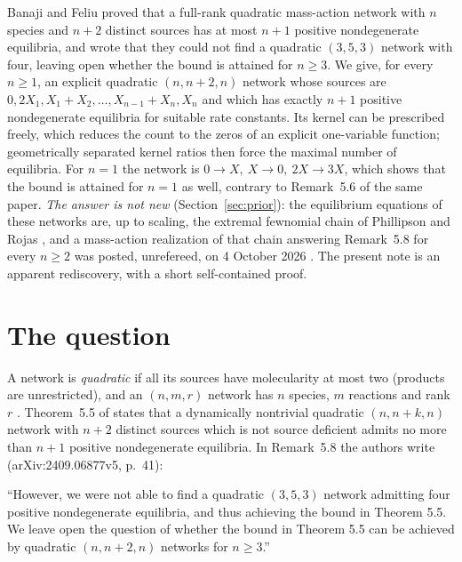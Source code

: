 \documentclass[11pt,a4paper]{report}
\begin{document}
\makepapertitle

\begin{paperabstract}
Banaji and Feliu proved that a full-rank quadratic mass-action network with \(n\) species and \(n+2\) distinct
sources has at most \(n+1\) positive nondegenerate equilibria, and wrote that they could not find a quadratic
\((3,5,3)\) network with four, leaving open whether the bound is attained for \(n\ge3\). We give, for every \(n\ge1\), an
explicit quadratic \((n,n+2,n)\) network whose sources are \(0,2X_1,X_1+X_2,\dots,X_{n-1}+X_n,X_n\) and which has exactly
\(n+1\) positive nondegenerate equilibria for suitable rate constants. Its kernel can be prescribed freely, which reduces
the count to the zeros of an explicit one-variable function; geometrically separated kernel ratios then force the
maximal number of equilibria. For \(n=1\) the network is \(0\to X,\ X\to0,\ 2X\to3X\), which shows that the bound is
attained for \(n=1\) as well, contrary to Remark~5.6 of the same paper.
\emph{The answer is not new} (Section~\ref{sec:prior}): the equilibrium equations of these networks are, up to
scaling, the extremal fewnomial chain of Phillipson and Rojas \autocite[Theorem~1.6]{PhillipsonRojas2013}, and a
mass-action realization of that chain answering Remark~5.8 for every \(n\ge2\) was posted, unrefereed, on 4 October
2026 \autocite{Anon2026}. The present note is an apparent rediscovery, with a short self-contained
proof.
\end{paperabstract}

\section*{The question}

A network is \emph{quadratic} if all its sources have molecularity at most two (products are unrestricted), and an
\((n,m,r)\) network has \(n\) species, \(m\) reactions and rank \(r\) \autocite{BanajiFeliu2026}. Theorem~5.5 of
\autocite{BanajiFeliu2026} states that a dynamically nontrivial quadratic \((n,n+k,n)\) network with \(n+2\) distinct
sources which is not source deficient admits no more than \(n+1\) positive nondegenerate equilibria. In Remark~5.8 the
authors write (arXiv:2409.06877v5, p.~41):

\begin{openquote}
``However, we were not able to find a quadratic \((3,5,3)\) network admitting four positive nondegenerate equilibria,
and thus achieving the bound in Theorem 5.5. We leave open the question of whether the bound in Theorem 5.5 can be
achieved by quadratic \((n, n+2, n)\) networks for \(n\ge3\).''
\end{openquote}
\end{document}
